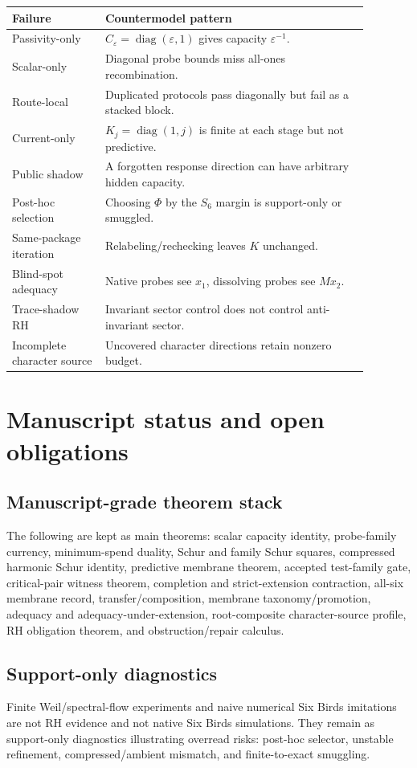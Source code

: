 \documentclass[11pt]{article}
\DeclareMathOperator{\diag}{diag}
\newcommand{\eps}{\varepsilon}
\begin{document}
\begin{longtable}{p{0.23\linewidth}p{0.65\linewidth}}
\toprule
Failure & Countermodel pattern\\
\midrule
Passivity-only & \(C_\eps=\diag(\eps,1)\) gives capacity \(\eps^{-1}\).\\
Scalar-only & Diagonal probe bounds miss all-ones recombination.\\
Route-local & Duplicated protocols pass diagonally but fail as a stacked block.\\
Current-only & \(K_j=\diag(1,j)\) is finite at each stage but not predictive.\\
Public shadow & A forgotten response direction can have arbitrary hidden capacity.\\
Post-hoc selection & Choosing \(\Phi\) by the \(S_6\) margin is support-only or smuggled.\\
Same-package iteration & Relabeling/rechecking leaves \(K\) unchanged.\\
Blind-spot adequacy & Native probes see \(x_1\), dissolving probes see \(Mx_2\).\\
Trace-shadow RH & Invariant sector control does not control anti-invariant sector.\\
Incomplete character source & Uncovered character directions retain nonzero budget.\\
\bottomrule
\end{longtable}

\section{Manuscript status and open obligations}

\subsection{Manuscript-grade theorem stack}
The following are kept as main theorems: scalar capacity identity, probe-family currency, minimum-spend duality, Schur and family Schur squares, compressed harmonic Schur identity, predictive membrane theorem, accepted test-family gate, critical-pair witness theorem, completion and strict-extension contraction, all-six membrane record, transfer/composition, membrane taxonomy/promotion, adequacy and adequacy-under-extension, root-composite character-source profile, RH obligation theorem, and obstruction/repair calculus.

\subsection{Support-only diagnostics}
Finite Weil/spectral-flow experiments and naive numerical Six Birds imitations are not RH evidence and not native Six Birds simulations.  They remain as support-only diagnostics illustrating overread risks: post-hoc selector, unstable refinement, compressed/ambient mismatch, and finite-to-exact smuggling.
\end{document}
